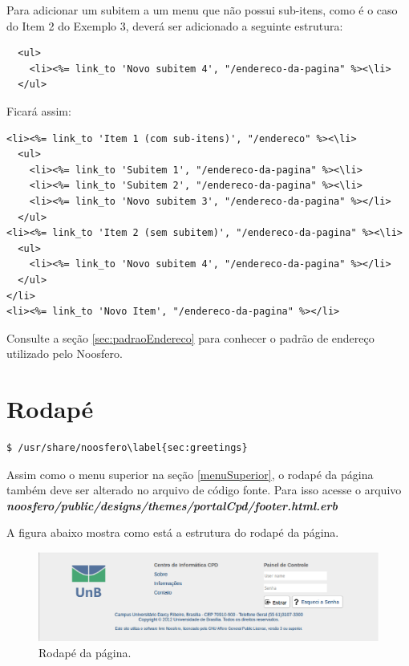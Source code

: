 Para adicionar um subitem a um menu que não possui sub-itens, como é o caso do Item 2 do Exemplo 3, deverá ser adicionado a seguinte estrutura:

\begin{verbatim}
  <ul>
    <li><%= link_to 'Novo subitem 4', "/endereco-da-pagina" %><\li>
  </ul>
\end{verbatim}

Ficará assim:

\begin{verbatim}
<li><%= link_to 'Item 1 (com sub-itens)', "/endereco" %><\li>
  <ul>
    <li><%= link_to 'Subitem 1', "/endereco-da-pagina" %><\li>
    <li><%= link_to 'Subitem 2', "/endereco-da-pagina" %><\li>
    <li><%= link_to 'Novo subitem 3', "/endereco-da-pagina" %></li>
  </ul>
<li><%= link_to 'Item 2 (sem subitem)', "/endereco-da-pagina" %><\li>
  <ul>
    <li><%= link_to 'Novo subitem 4', "/endereco-da-pagina" %></li>
  </ul>
</li>
<li><%= link_to 'Novo Item', "/endereco-da-pagina" %></li>
\end{verbatim}

Consulte a seção \ref{sec:padraoEndereco} para conhecer o padrão de endereço utilizado pelo Noosfero.

\newpage
\section{Rodapé}

\begin{lstlisting}
$ /usr/share/noosfero\label{sec:greetings}
\end{lstlisting}

Assim como o menu superior na seção \ref{menuSuperior}, o rodapé da página também deve ser alterado no arquivo de código fonte. Para isso acesse o arquivo \textbf{\textit{noosfero/public/designs/themes/portalCpd/footer.html.erb}}

A figura abaixo mostra como está a estrutura do rodapé da página.
\begin{figure}[h]
     \centering
       \includegraphics[keepaspectratio=true,scale=0.49]{figuras/footer.eps}
     \caption{Rodapé da página.}
\end{figure}

